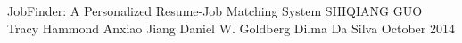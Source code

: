 \approvalfour
{JobFinder: A Personalized Resume-Job Matching System
}
{SHIQIANG GUO}%
{Tracy Hammond
}
{Anxiao Jiang
}
{Daniel W. Goldberg
}
{Dilma Da Silva}
{October 2014}%

%
%

